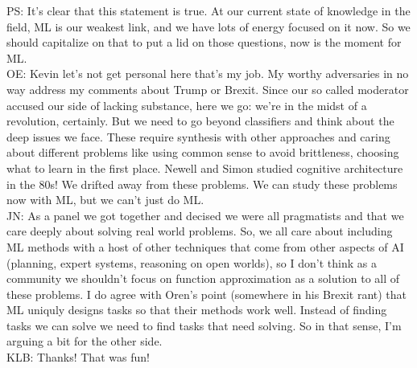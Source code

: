 PS: It's clear that this statement is true. At our current state of knowledge in the field, ML is our weakest link, and we have lots of energy focused on it now. So we should capitalize on that to put a lid on those questions, now is the moment for ML. \\

OE: Kevin let's not get personal here that's my job. My worthy adversaries in no way address my comments about Trump or Brexit. Since our so called moderator accused our side of lacking substance, here we go: we're in the midst of a revolution, certainly. But we need to go beyond classifiers and think about the deep issues we face. These require synthesis with other approaches and caring about different problems like using common sense to avoid brittleness, choosing what to learn in the first place. Newell and Simon studied cognitive architecture in the 80s! We drifted away from these problems. We can study these problems now with ML, but we can't just do ML. \\

JN: As a panel we got together and decised we were all pragmatists and that we care deeply about solving real world problems. So, we all care about including ML methods with a host of other techniques that come from other aspects of AI (planning, expert systems, reasoning on open worlds), so I don't think as a community we shouldn't focus on function approximation as a solution to all of these problems. I do agree with Oren's point (somewhere in his Brexit rant) that ML uniquly designs tasks so that their methods work well. Instead of finding tasks we can solve we need to find tasks that need solving. So in that sense, I'm arguing a bit for the other side. \\

KLB: Thanks! That was fun!\\

\spacerule